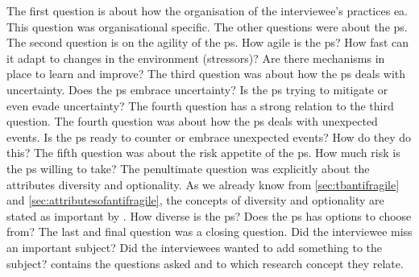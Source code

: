 The first question is about how the organisation of the interviewee's practices \acrshort{ea}. This question was organisational specific. The other questions were about the \gls{ps}. The second question is on the agility of the \gls{ps}. How agile is the \gls{ps}? How fast can it adapt to changes in the environment (\glspl{stressor})? Are there mechanisms in place to learn and improve? The third question was about how the \gls{ps} deals with \gls{uncertainty}. Does the \gls{ps} embrace uncertainty? Is the \gls{ps} trying to mitigate or even evade \gls{uncertainty}? The fourth question has a strong relation to the third question. The fourth question was about how the \gls{ps} deals with unexpected events. Is the \gls{ps} ready to counter or embrace unexpected events? How do they do this? The fifth question was about the risk appetite of the \gls{ps}. How much risk is the \gls{ps} willing to take? The penultimate question was explicitly about the \glspl{attribute} \gls{diversity} and \gls{optionality}. As we already know from  \cref{sec:tbantifragile} and \cref{sec:attributesofantifragile}, the concepts of \gls{diversity} and \gls{optionality} are stated as important by \textcites{Taleb2012}{Gorgeon2015}{Botjes2021}. How diverse is the \gls{ps}? Does the \gls{ps} has options to choose from? The last and final question was a closing question. Did the interviewee miss an important subject? Did the interviewees wanted to add something to the subject?  contains the questions asked and to which research concept they relate.

